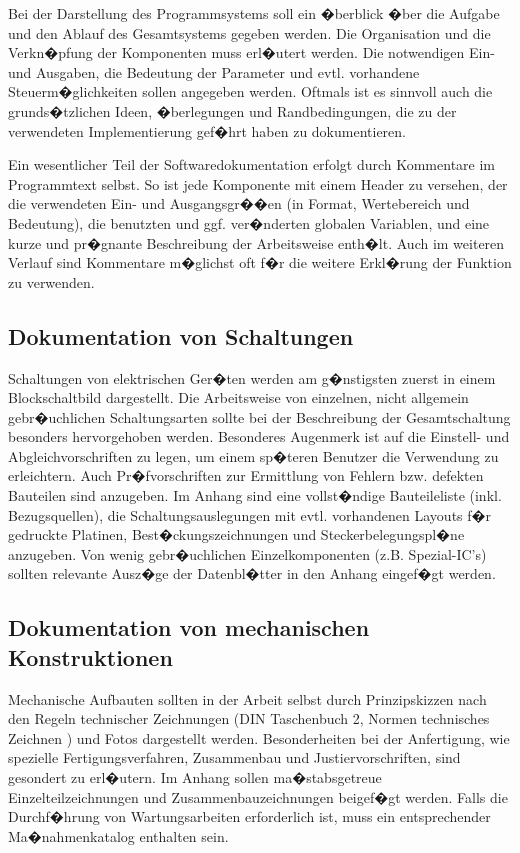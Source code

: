 Bei der Darstellung des Programmsystems soll ein �berblick �ber die Aufgabe und den Ablauf des
Gesamtsystems gegeben werden. Die Organisation und die Verkn�pfung der Komponenten muss erl�utert
werden. Die notwendigen Ein- und Ausgaben, die Bedeutung der Parameter und evtl. vorhandene
Steuerm�glichkeiten sollen angegeben werden. Oftmals ist es sinnvoll auch die grunds�tzlichen
Ideen, �berlegungen und Randbedingungen, die zu der verwendeten Implementierung gef�hrt haben zu
dokumentieren.

Ein wesentlicher Teil der Softwaredokumentation erfolgt durch Kommentare im Programmtext selbst. So
ist jede Komponente mit einem Header zu versehen, der die verwendeten Ein- und Ausgangsgr��en (in
Format, Wertebereich und Bedeutung), die benutzten und ggf. ver�nderten globalen Variablen, und
eine kurze und pr�gnante Beschreibung der Arbeitsweise enth�lt. Auch im weiteren Verlauf sind
Kommentare m�glichst oft f�r die weitere Erkl�rung der Funktion zu verwenden.


\subsection{Dokumentation von Schaltungen}
Schaltungen von elektrischen Ger�ten werden am g�nstigsten zuerst in einem Blockschaltbild
dargestellt. Die Arbeitsweise von einzelnen, nicht allgemein gebr�uchlichen Schaltungsarten sollte
bei der Beschreibung der Gesamtschaltung besonders hervorgehoben werden. Besonderes Augenmerk ist
auf die Einstell- und Abgleichvorschriften zu legen, um einem sp�teren Benutzer die Verwendung zu
erleichtern. Auch Pr�fvorschriften zur Ermittlung von Fehlern bzw. defekten Bauteilen sind
anzugeben. Im Anhang sind eine vollst�ndige Bauteileliste (inkl. Bezugsquellen), die
Schaltungsauslegungen mit evtl. vorhandenen Layouts f�r gedruckte Platinen, Best�ckungszeichnungen
und Steckerbelegungspl�ne anzugeben. Von wenig gebr�uchlichen Einzelkomponenten (z.B. Spezial-IC's)
sollten relevante Ausz�ge der Datenbl�tter in den Anhang eingef�gt werden.

\subsection{Dokumentation von mechanischen Konstruktionen}
Mechanische Aufbauten sollten in der Arbeit selbst durch Prinzipskizzen nach den Regeln technischer
Zeichnungen (DIN Taschenbuch 2, Normen technisches Zeichnen \cite{DIN_Norm_TZ}) und Fotos
dargestellt werden. Besonderheiten bei der Anfertigung, wie spezielle Fertigungsverfahren,
Zusammenbau und Justiervorschriften, sind gesondert zu erl�utern. Im Anhang sollen ma�stabsgetreue
Einzelteilzeichnungen und Zusammenbauzeichnungen beigef�gt werden. Falls die Durchf�hrung von
Wartungsarbeiten erforderlich ist, muss ein entsprechender Ma�nahmenkatalog enthalten sein.

